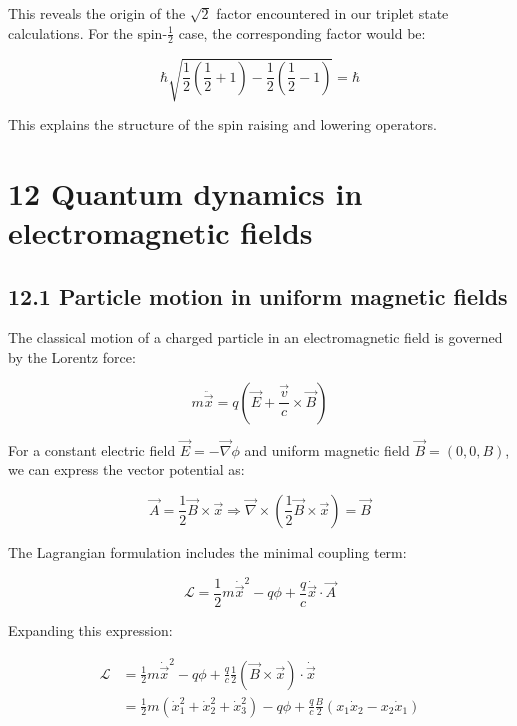 \documentclass[10pt]{article}
\begin{document}
This reveals the origin of the $\sqrt{2}$ factor encountered in our triplet state calculations. For the spin-$\frac{1}{2}$ case, the corresponding factor would be:

\begin{equation*}
\hbar \sqrt{\frac{1}{2}(\frac{1}{2}+1)-\frac{1}{2}(\frac{1}{2}-1)}=\hbar \tag{11.77}
\end{equation*}

This explains the structure of the spin raising and lowering operators.

\section*{12 Quantum dynamics in electromagnetic fields}
\subsection*{12.1 Particle motion in uniform magnetic fields}
The classical motion of a charged particle in an electromagnetic field is governed by the Lorentz force:

\begin{equation*}
m \ddot{\vec{x}}=q(\vec{E}+\frac{\vec{v}}{c} \times \vec{B}) \tag{12.1}
\end{equation*}

For a constant electric field $\vec{E}=-\vec{\nabla} \phi$ and uniform magnetic field $\vec{B}=(0,0,B)$, we can express the vector potential as:

\begin{equation*}
\vec{A}=\frac{1}{2} \vec{B} \times \vec{x} \Rightarrow \vec{\nabla} \times(\frac{1}{2} \vec{B} \times \vec{x})=\vec{B} \tag{12.2}
\end{equation*}

The Lagrangian formulation includes the minimal coupling term:

\begin{equation*}
\mathcal{L}=\frac{1}{2} m \dot{\vec{x}}^{2}-q \phi+\frac{q}{c} \dot{\vec{x}} \cdot \vec{A} \tag{12.3}
\end{equation*}

Expanding this expression:

\begin{align*}
\mathcal{L} &= \frac{1}{2} m \dot{\vec{x}}^{2}-q \phi+\frac{q}{c} \frac{1}{2} (\vec{B} \times \vec{x}) \cdot \dot{\vec{x}}\\
&= \frac{1}{2} m(\dot{x}_{1}^{2}+\dot{x}_{2}^{2}+\dot{x}_{3}^{2})-q \phi+\frac{q}{c} \frac{B}{2}(x_{1} \dot{x}_{2}-x_{2}\dot{x}_{1}) \tag{12.4}
\end{align*}
\end{document}
